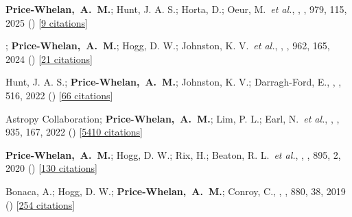 \item[{\color{deemph}\scriptsize12}]\textbf{Price-Whelan,~A.~M.}; Hunt, J. A. S.; Horta, D.; Oeur, M.~\textit{et al.}, , \apj, 979, 115, 2025 () [\href{http://adsabs.harvard.edu/abs/2025ApJ...979..115P}{9 citations}]

\item[{\color{deemph}\scriptsize11}]; \textbf{Price-Whelan,~A.~M.}; Hogg, D. W.; Johnston, K. V.~\textit{et al.}, , \apj, 962, 165, 2024 () [\href{http://adsabs.harvard.edu/abs/2024ApJ...962..165H}{21 citations}]

\item[{\color{deemph}\scriptsize10}]Hunt, J. A. S.; \textbf{Price-Whelan,~A.~M.}; Johnston, K. V.; Darragh-Ford, E., , \mnras, 516, 2022 () [\href{http://adsabs.harvard.edu/abs/2022MNRAS.516L...7H}{66 citations}]

\item[{\color{deemph}\scriptsize9}]Astropy Collaboration; \textbf{Price-Whelan,~A.~M.}; Lim, P. L.; Earl, N.~\textit{et al.}, , \apj, 935, 167, 2022 () [\href{http://adsabs.harvard.edu/abs/2022ApJ...935..167A}{5410 citations}]

\item[{\color{deemph}\scriptsize8}]\textbf{Price-Whelan,~A.~M.}; Hogg, D. W.; Rix, H.; Beaton, R. L.~\textit{et al.}, , \apj, 895, 2, 2020 () [\href{http://adsabs.harvard.edu/abs/2020ApJ...895....2P}{130 citations}]

\item[{\color{deemph}\scriptsize7}]Bonaca, A.; Hogg, D. W.; \textbf{Price-Whelan,~A.~M.}; Conroy, C., , \apj, 880, 38, 2019 () [\href{http://adsabs.harvard.edu/abs/2019ApJ...880...38B}{254 citations}]


